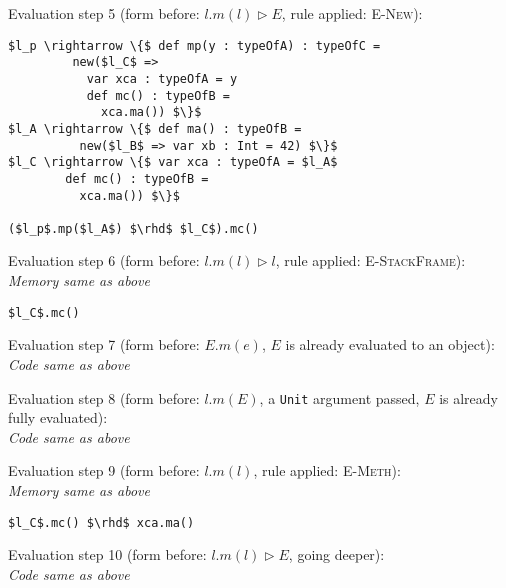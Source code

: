 \documentclass{llncs}
\begin{document}
\vspace{12pt}
\noindent Evaluation step 5 (form before: $l.m(l) \rhd E$, rule applied: \textsc{E-New}):
\vspace{-6pt}
\begin{lstlisting}[xleftmargin=20pt]
$l_p \rightarrow \{$ def mp(y : typeOfA) : typeOfC =
         new($l_C$ =>
           var xca : typeOfA = y
           def mc() : typeOfB =
             xca.ma()) $\}$
$l_A \rightarrow \{$ def ma() : typeOfB =
          new($l_B$ => var xb : Int = 42) $\}$
$l_C \rightarrow \{$ var xca : typeOfA = $l_A$
        def mc() : typeOfB =
          xca.ma()) $\}$

($l_p$.mp($l_A$) $\rhd$ $l_C$).mc()
\end{lstlisting}

\vspace{12pt}
\noindent Evaluation step 6 (form before: $l.m(l) \rhd l$, rule applied: \textsc{E-StackFrame}):\\
\vspace{-6pt}
\indent\textit{Memory same as above}\\
\vspace{-6pt}
\begin{lstlisting}[xleftmargin=20pt]
$l_C$.mc()
\end{lstlisting}

\vspace{12pt}
\noindent Evaluation step 7 (form before: $E.m(e)$, $E$ is already evaluated to an object):\\
\indent\textit{Code same as above}

\vspace{12pt}
\noindent Evaluation step 8 (form before: $l.m(E)$, a \lstinline{Unit} argument passed, $E$ is already fully evaluated):\\
\indent\textit{Code same as above}

\vspace{12pt}
\noindent Evaluation step 9 (form before: $l.m(l)$, rule applied: \textsc{E-Meth}):\\
\vspace{-6pt}
\indent\textit{Memory same as above}\\
\vspace{-6pt}
\begin{lstlisting}[xleftmargin=20pt]
$l_C$.mc() $\rhd$ xca.ma()
\end{lstlisting}

\vspace{12pt}
\noindent Evaluation step 10 (form before: $l.m(l) \rhd E$, going deeper):\\
\textit{Code same as above}
\end{document}
